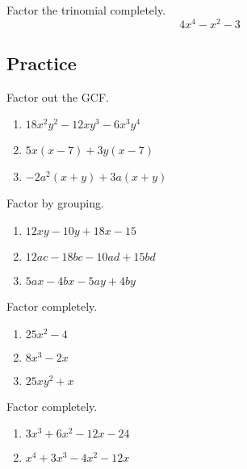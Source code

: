 \begin{example}
  Factor the trinomial completely.
  \[4x^4-x^2-3\]
\end{example}
\vspace*{4\baselineskip}

\subsection{Practice}

\begin{exercise}
  Factor out the GCF.
  
  \begin{enumerate}
  \item
    \(18x^2y^2-12xy^3-6x^3y^4\)
  \item
    \(5x(x-7)+3y(x-7)\)
  \item
    \(-2a^2(x+y)+3a(x+y)\)
  \end{enumerate}
\end{exercise}

\begin{exercise}
  Factor by grouping.
  
  \begin{enumerate}
  \item
    \(12xy-10y+18x-15\)
  \item
    \(12ac-18bc-10ad+15bd\)
  \item
    \(5ax-4bx-5ay+4by\)
  \end{enumerate}
\end{exercise}

\begin{exercise}
  Factor completely.
  
  \begin{enumerate}
  \item
    \(25x^2-4\)
  \item
    \(8x^3-2x\)
  \item
    \(25xy^2+x\)
  \end{enumerate}
\end{exercise}

\begin{exercise}
  Factor completely.
  
  \begin{enumerate}
  \item
    \(3x^3+6x^2-12x-24\)
  \item
    \(x^4+3x^3-4x^2-12x\)
  \end{enumerate}
\end{exercise}


